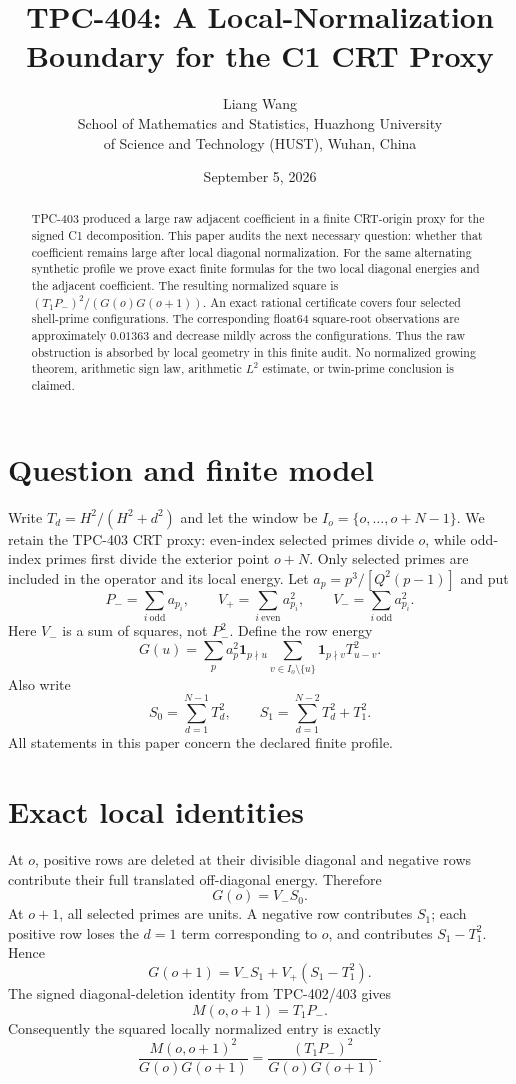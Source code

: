 \documentclass[11pt]{article}
\title{TPC-404: A Local-Normalization Boundary for the C1 CRT Proxy}
\author{Liang Wang\\School of Mathematics and Statistics, Huazhong University\\of Science and Technology (HUST), Wuhan, China}
\date{September 5, 2026}
\begin{document}
\maketitle

\begin{abstract}
TPC-403 produced a large raw adjacent coefficient in a finite CRT-origin
proxy for the signed C1 decomposition.  This paper audits the next necessary
question: whether that coefficient remains large after local diagonal
normalization.  For the same alternating synthetic profile we prove exact
finite formulas for the two local diagonal energies and the adjacent
coefficient.  The resulting normalized square is
$(T_1P_-)^2/(G(o)G(o+1))$.  An exact rational certificate covers four selected
shell-prime configurations.  The corresponding float64 square-root
observations are approximately $0.01363$ and decrease mildly across the
configurations.  Thus the raw obstruction is absorbed by local geometry in
this finite audit.  No normalized growing theorem, arithmetic sign law,
arithmetic $L^2$ estimate, or twin-prime conclusion is claimed.
\end{abstract}

\section{Question and finite model}
Write $T_d=H^2/(H^2+d^2)$ and let the window be
$I_o=\{o,\ldots,o+N-1\}$.  We retain the TPC-403 CRT proxy: even-index
selected primes divide $o$, while odd-index primes first divide the exterior
point $o+N$.  Only selected primes are included in the operator and its local
energy.  Let $a_p=p^3/[Q^2(p-1)]$ and put
\[
 P_-=\sum_{i\ \mathrm{odd}}a_{p_i},\qquad
 V_+=\sum_{i\ \mathrm{even}}a_{p_i}^{2},\qquad
 V_-=\sum_{i\ \mathrm{odd}}a_{p_i}^{2}.
\]
Here $V_-$ is a sum of squares, not $P_-^2$.  Define the row energy
\[
G(u)=\sum_p a_p^2\mathbf{1}_{p\nmid u}
       \sum_{v\in I_o\setminus\{u\}}\mathbf{1}_{p\nmid v}T_{u-v}^2.
\]
Also write
\[
 S_0=\sum_{d=1}^{N-1}T_d^2,\qquad
 S_1=\sum_{d=1}^{N-2}T_d^2+T_1^2.
\]
All statements in this paper concern the declared finite profile.

\section{Exact local identities}
At $o$, positive rows are deleted at their divisible diagonal and negative rows
contribute their full translated off-diagonal energy.  Therefore
\[
 G(o)=V_-S_0.
\]
At $o+1$, all selected primes are units.  A negative row contributes $S_1$;
each positive row loses the $d=1$ term corresponding to $o$, and contributes
$S_1-T_1^2$.  Hence
\[
 G(o+1)=V_-S_1+V_+(S_1-T_1^2).
\]
The signed diagonal-deletion identity from TPC-402/403 gives
\[
 M(o,o+1)=T_1P_-.
\]
Consequently the squared locally normalized entry is exactly
\[
 \boxed{\frac{M(o,o+1)^2}{G(o)G(o+1)}
 =\frac{(T_1P_-)^2}{G(o)G(o+1)}}. \tag{1}
\]
\end{document}
